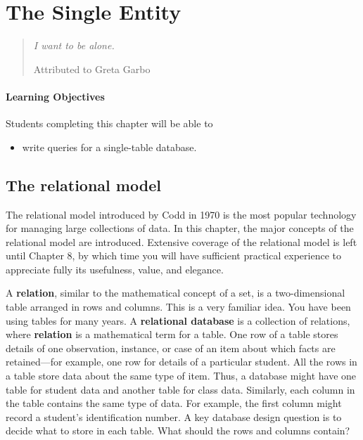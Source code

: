 \documentclass[
]{article}
\providecommand{\tightlist}{%
  \setlength{\itemsep}{0pt}\setlength{\parskip}{0pt}}
\begin{document}
\hypertarget{the-single-entity}{%
\section{The Single Entity}\label{the-single-entity}}

\begin{quote}
\emph{I want to be alone.}

Attributed to Greta Garbo
\end{quote}

\hypertarget{learning-objectives}{%
\paragraph*{Learning Objectives}\label{learning-objectives}}

Students completing this chapter will be able to

\begin{itemize}
\tightlist
\item
  write queries for a single-table database.
\end{itemize}

\hypertarget{the-relational-model}{%
\subsection{The relational model}\label{the-relational-model}}

The relational model introduced by Codd in 1970 is the most popular
technology for managing large collections of data. In this chapter, the
major concepts of the relational model are introduced. Extensive
coverage of the relational model is left until Chapter 8, by which time
you will have sufficient practical experience to appreciate fully its
usefulness, value, and elegance.

A \textbf{relation}, similar to the mathematical concept of a set, is a
two-dimensional table arranged in rows and columns. This is a very
familiar idea. You have been using tables for many years. A
\textbf{relational database} is a collection of relations, where
\textbf{relation} is a mathematical term for a table. One row of a table
stores details of one observation, instance, or case of an item about
which facts are retained---for example, one row for details of a
particular student. All the rows in a table store data about the same
type of item. Thus, a database might have one table for student data and
another table for class data. Similarly, each column in the table
contains the same type of data. For example, the first column might
record a student's identification number. A key database design question
is to decide what to store in each table. What should the rows and
columns contain?
\end{document}

